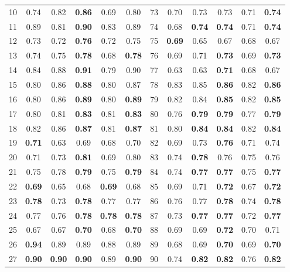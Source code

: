 \documentclass{article}
\begin{document}
{\begin{longtable}{cccccc@{\qquad}cccccc}
10 & 0.74 & 0.82 & \textbf{0.86} & 0.69 & 0.80 & 73 & 0.70 & 0.73 & 0.73 & 0.71 & \textbf{0.74} \\
11 & 0.89 & 0.81 & \textbf{0.90} & 0.83 & 0.89 & 74 & 0.68 & \textbf{0.74} & \textbf{0.74} & 0.71 & \textbf{0.74} \\
12 & 0.73 & 0.72 & \textbf{0.76} & 0.72 & 0.75 & 75 & \textbf{0.69} & 0.65 & 0.67 & 0.68 & 0.67 \\
13 & 0.74 & 0.75 & \textbf{0.78} & 0.68 & \textbf{0.78} & 76 & 0.69 & 0.71 & \textbf{0.73} & 0.69 & \textbf{0.73} \\
14 & 0.84 & 0.88 & \textbf{0.91} & 0.79 & 0.90 & 77 & 0.63 & 0.63 & \textbf{0.71} & 0.68 & 0.67 \\
15 & 0.80 & 0.86 & \textbf{0.88} & 0.80 & 0.87 & 78 & 0.83 & 0.85 & \textbf{0.86} & 0.82 & \textbf{0.86} \\
16 & 0.80 & 0.86 & \textbf{0.89} & 0.80 & \textbf{0.89} & 79 & 0.82 & 0.84 & \textbf{0.85} & 0.82 & \textbf{0.85} \\
17 & 0.80 & 0.81 & \textbf{0.83} & 0.81 & \textbf{0.83} & 80 & 0.76 & \textbf{0.79} & \textbf{0.79} & 0.77 & \textbf{0.79} \\
18 & 0.82 & 0.86 & \textbf{0.87} & 0.81 & \textbf{0.87} & 81 & 0.80 & \textbf{0.84} & \textbf{0.84} & 0.82 & \textbf{0.84} \\
19 & \textbf{0.71} & 0.63 & 0.69 & 0.68 & 0.70 & 82 & 0.69 & 0.73 & \textbf{0.76} & 0.71 & 0.74 \\
20 & 0.71 & 0.73 & \textbf{0.81} & 0.69 & 0.80 & 83 & 0.74 & \textbf{0.78} & 0.76 & 0.75 & 0.76 \\
21 & 0.75 & 0.78 & \textbf{0.79} & 0.75 & \textbf{0.79} & 84 & 0.74 & \textbf{0.77} & \textbf{0.77} & 0.75 & \textbf{0.77} \\
22 & \textbf{0.69} & 0.65 & 0.68 & \textbf{0.69} & 0.68 & 85 & 0.69 & 0.71 & \textbf{0.72} & 0.67 & \textbf{0.72} \\
23 & \textbf{0.78} & 0.73 & \textbf{0.78} & 0.77 & 0.77 & 86 & 0.76 & 0.77 & \textbf{0.78} & 0.74 & \textbf{0.78} \\
24 & 0.77 & 0.76 & \textbf{0.78} & \textbf{0.78} & \textbf{0.78} & 87 & 0.73 & \textbf{0.77} & \textbf{0.77} & 0.72 & \textbf{0.77} \\
25 & 0.67 & 0.67 & \textbf{0.70} & 0.68 & \textbf{0.70} & 88 & 0.69 & 0.69 & \textbf{0.72} & 0.70 & 0.71 \\
26 & \textbf{0.94} & 0.89 & 0.89 & 0.88 & 0.89 & 89 & 0.68 & 0.69 & \textbf{0.70} & 0.69 & \textbf{0.70} \\
27 & \textbf{0.90} & \textbf{0.90} & \textbf{0.90} & 0.89 & \textbf{0.90} & 90 & 0.74 & \textbf{0.82} & \textbf{0.82} & 0.76 & \textbf{0.82} \\

\end{longtable}}
\end{document}
